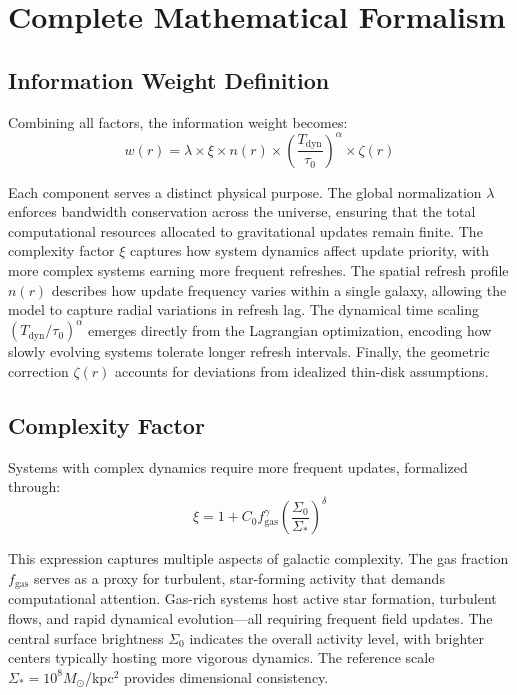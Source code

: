 \documentclass[twocolumn,prd,amsmath,amssymb,aps,superscriptaddress,nofootinbib]{revtex4-2}
\begin{document}
\section{Complete Mathematical Formalism}
\label{sec:formalism}

\subsection{Information Weight Definition}

Combining all factors, the information weight becomes:
\begin{equation}
w(r) = \lambda \times \xi \times n(r) \times \left(\frac{T_{\text{dyn}}}{\tau_0}\right)^\alpha \times \zeta(r)
\end{equation}

Each component serves a distinct physical purpose. The global normalization $\lambda$ enforces bandwidth conservation across the universe, ensuring that the total computational resources allocated to gravitational updates remain finite. The complexity factor $\xi$ captures how system dynamics affect update priority, with more complex systems earning more frequent refreshes. The spatial refresh profile $n(r)$ describes how update frequency varies within a single galaxy, allowing the model to capture radial variations in refresh lag. The dynamical time scaling $(T_{\text{dyn}}/\tau_0)^\alpha$ emerges directly from the Lagrangian optimization, encoding how slowly evolving systems tolerate longer refresh intervals. Finally, the geometric correction $\zeta(r)$ accounts for deviations from idealized thin-disk assumptions.

\subsection{Complexity Factor}

Systems with complex dynamics require more frequent updates, formalized through:
\begin{equation}
\xi = 1 + C_0 f_{\text{gas}}^\gamma \left(\frac{\Sigma_0}{\Sigma_*}\right)^\delta
\end{equation}

This expression captures multiple aspects of galactic complexity. The gas fraction $f_{\text{gas}}$ serves as a proxy for turbulent, star-forming activity that demands computational attention. Gas-rich systems host active star formation, turbulent flows, and rapid dynamical evolution---all requiring frequent field updates. The central surface brightness $\Sigma_0$ indicates the overall activity level, with brighter centers typically hosting more vigorous dynamics. The reference scale $\Sigma_* = 10^8 M_\odot$/kpc$^2$ provides dimensional consistency.
\end{document}
